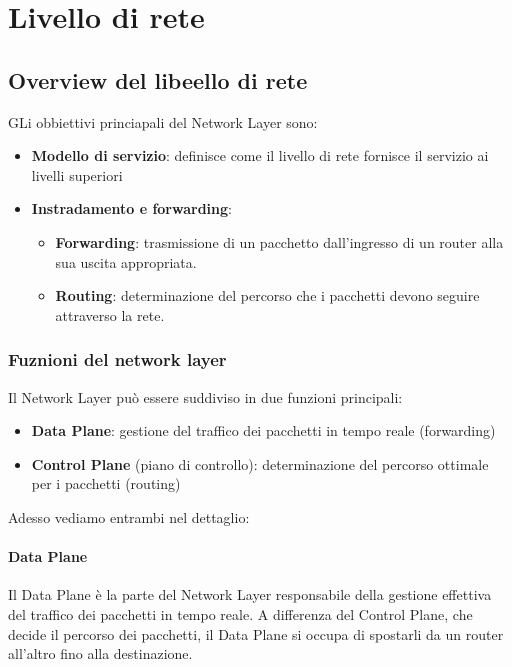 \chapter{Livello di rete}
\section{Overview del libeello di rete}

GLi obbiettivi princiapali del Network Layer sono:
\begin{itemize}
    \item \textbf{Modello di servizio}: definisce come il livello di rete fornisce il servizio ai livelli superiori
    \item \textbf{Instradamento e forwarding}:
    \begin{itemize}
        \item \textbf{Forwarding}: trasmissione di un pacchetto dall’ingresso di un router alla sua uscita appropriata.
        \item \textbf{Routing}: determinazione del percorso che i pacchetti devono seguire attraverso la rete.
    \end{itemize}
\end{itemize}

\subsection{Fuznioni del network layer}
Il Network Layer può essere suddiviso in due funzioni principali:
\begin{itemize}
    \item \textbf{Data Plane}: gestione del traffico dei pacchetti in tempo reale (forwarding)
    \item \textbf{Control Plane} (piano di controllo): determinazione del percorso ottimale per i pacchetti (routing)
\end{itemize}

Adesso vediamo entrambi nel dettaglio:

\subsubsection{Data Plane}
Il Data Plane è la parte del Network Layer responsabile della gestione effettiva del traffico dei pacchetti in tempo reale. A differenza del Control Plane, che decide il percorso dei pacchetti, il Data Plane si occupa di spostarli da un router all’altro fino alla destinazione.

